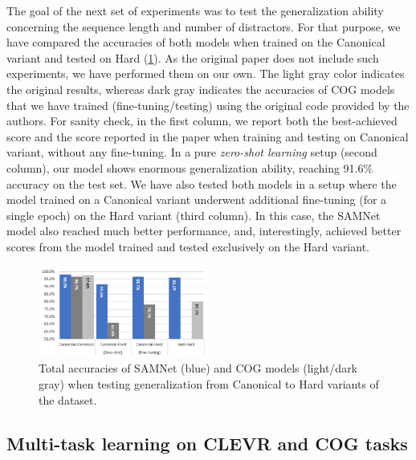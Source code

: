 The goal of the next set of experiments was to test the generalization ability concerning the sequence length and number of distractors.
For that purpose, we have compared the accuracies of both models when trained on the Canonical variant and tested on Hard (\cref{fig:samnet_cog_overall_transfer}).
As the original paper does not include such experiments, we have performed them on our own. The light gray color indicates the original results, whereas dark gray indicates the accuracies of COG models that we have trained (fine-tuning/testing) using the original code provided by the authors.
For sanity check, in the first column, we report both the best-achieved score and the score reported in the paper when training and testing on Canonical variant, without any fine-tuning.
In a pure \textit{zero-shot learning} setup (second column), our model shows enormous generalization ability, reaching 91.6\% accuracy on the test set.
We have also tested both models in a setup where the model trained on a Canonical variant underwent additional fine-tuning (for a single epoch) on the Hard variant (third column).
In this case, the SAMNet model also reached much better performance, and, interestingly, achieved better scores from the model trained and tested exclusively on the Hard variant.

\begin{figure}[htb]
	\centering
	\includegraphics[width=0.5\textwidth]{img/results/samnet_cog_overall_transfer.png}
	\caption{Total accuracies of SAMNet (blue) and COG models (light/dark gray) when testing generalization from Canonical to Hard variants of the dataset.}
	\label{fig:samnet_cog_overall_transfer}
\end{figure}

\subsection{Multi-task learning on CLEVR and COG tasks}


